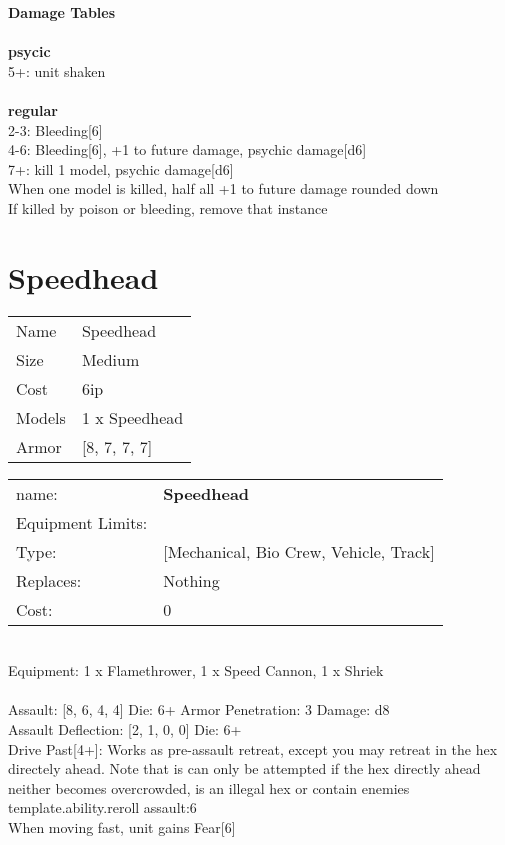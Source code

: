 {\bf Damage Tables} \\
\ \\ {\bf psycic } \\
5+: unit shaken \\
\ \\ {\bf regular } \\
2-3: Bleeding[6] \\
4-6: Bleeding[6], +1 to future damage, psychic damage[d6] \\
7+: kill 1 model, psychic damage[d6] \\
When one model is killed, half all +1 to future damage rounded down \\
If killed by poison or bleeding, remove that instance \\










\pagebreak\pagebreak

\section{ Speedhead }

\begin{tabular}{ll}
  Name & Speedhead \\
  Size & Medium\\
  Cost & 6ip\\
  Models & 1 x Speedhead\\
  Armor & [8, 7, 7, 7]\\
\end{tabular}

\noindent 

\noindent
\begin{tabular}{ll}
name: &{\bf Speedhead } \\
Equipment Limits: & \\
Type: &[Mechanical, Bio Crew, Vehicle, Track] \\
Replaces: &Nothing \\
Cost: & 0\\
\end{tabular}
\ \\
Equipment: 1 x Flamethrower, 1 x Speed Cannon, 1 x Shriek \\
\ \\
Assault: [8, 6, 4, 4] Die: 6+ Armor Penetration: 3 Damage: d8 \\
Assault Deflection: [2, 1, 0, 0] Die: 6+\\
\indent Drive Past[4+]: Works as pre-assault retreat, except you may retreat in the hex directely ahead. Note that is can only be attempted if the hex directly ahead neither becomes overcrowded, is an illegal hex or contain enemies\\ 
{template.ability.reroll assault:6}\\ 
When moving fast, unit gains Fear[6]\\ 
 
